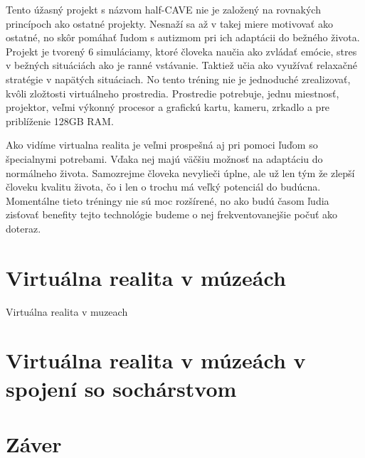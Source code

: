 \documentclass[10pt,twoside,slovak,a4paper]{article}
\begin{document}
Tento úžasný projekt s názvom half-CAVE nie je založený na rovnakých princípoch ako ostatné projekty. Nesnaží sa až v takej miere motivovať ako ostatné, no skôr pomáhať ľudom s autizmom pri ich adaptácii do bežného života. Projekt je tvorený 6 simuláciamy, ktoré človeka naučia ako zvládať emócie, stres v bežných situáciách ako je ranné vstávanie. Taktiež učia ako využívať relaxačné stratégie v napätých situáciach. No tento tréning nie je jednoduché zrealizovať, kvôli zložtosti virtuálneho prostredia. Prostredie potrebuje, jednu miestnosť, projektor, veľmi výkonný procesor a grafickú kartu, kameru, zrkadlo a pre priblíženie 128GB RAM.~\cite{Autism}

Ako vidíme virtualna realita je veľmi prospešná aj pri pomoci ľuďom so špecialnymi potrebami. Vďaka nej majú väčšiu možnosť na adaptáciu do normálneho života. Samozrejme človeka nevylieči úplne, ale už len tým že zlepší človeku kvalitu života, čo i len o trochu má veľký potenciál do budúcna. Momentálne tieto tréningy nie sú moc rozšírené, no ako budú časom ľudia zisťovať benefity tejto technológie budeme o nej frekventovanejšie počuť ako doteraz.   

\section{Virtuálna realita v múzeách} \label{muzea}
Virtuálna realita v muzeach

\section{Virtuálna realita v múzeách v spojení so sochárstvom} \label{produkt}


\section{Záver} \label{zaver} %






\end{document}
